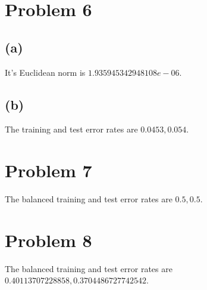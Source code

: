 \documentclass[11pt]{article}
\begin{document}
\section*{Problem 6}
\subsection*{(a)}
It's Euclidean norm is $1.935945342948108e-06$.

\subsection*{(b)}
The training and test error rates are $0.0453, 0.054$.

\section*{Problem 7}
The balanced training and test error rates are $0.5, 0.5$.

\section*{Problem 8}
The balanced training and test error rates are $0.40113707228858, 0.3704486727742542$.
\end{document}
